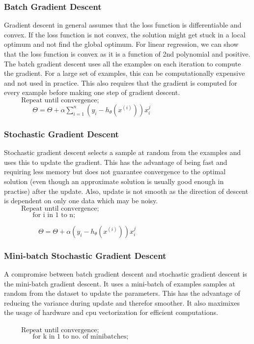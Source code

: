 \documentclass[12pt,a4paper,titlepage,landscape]{book}
\begin{document}
	\subsubsection{Batch Gradient Descent}
	Gradient descent in general assumes that the loss function is differentiable and convex. If the loss function is not convex, the solution might get stuck in a local optimum and not find the global optimum. For linear regression, we can show that the loss function is convex as it is a function of 2nd polynomial and positive. \\ 
	The batch gradient descent uses all the examples on each iteration to compute the gradient. For a large set of examples, this can be computationally expensive and not used in practice. This also requires that the gradient is computed for every example before making one step of gradient descent. 
	\\
	${}\hspace{30pt} \text{Repeat until convergence;} $\\
	${}\hspace{50pt} \Theta = \Theta + \alpha\sum_{i=1}^{n}\left(y_i - h_\theta(x^{(i)})\right)x_i^j $
	
	\subsubsection{Stochastic Gradient Descent}
	Stochastic gradient descent selects a sample at random from the examples and uses this to update the gradient. This has the advantage of being fast and requiring less memory but does not guarantee convergence to the optimal solution (even though an approximate solution is usually good enough in practise) after the update. Also, update is not smooth as the direction of descent is dependent on only one data which may be noisy. \\
	${}\hspace{30pt} \text{Repeat until convergence;} $\\
	${}\hspace{50pt} \text{for i in 1 to n;} $
	
	${}\hspace{60pt} \Theta = \Theta + \alpha\left(y_i - h_\theta(x^{(i)})\right)x_i^j $
	
	\subsubsection{Mini-batch Stochastic Gradient Descent}
	A compromise between batch gradient descent and stochastic gradient descent is the mini-batch gradient descent. It uses a mini-batch of examples samples at random from the dataset  to update the parameters. This has the advantage of reducing the variance during update and therefor smoother. It also maximixes the usage of hardware and cpu vectorization for efficient computations. \\ \\
	${}\hspace{30pt} \text{Repeat until convergence;} $\\
	${}\hspace{50pt} \text{for k in 1 to no. of minibatches;} $
	 
\end{document}
